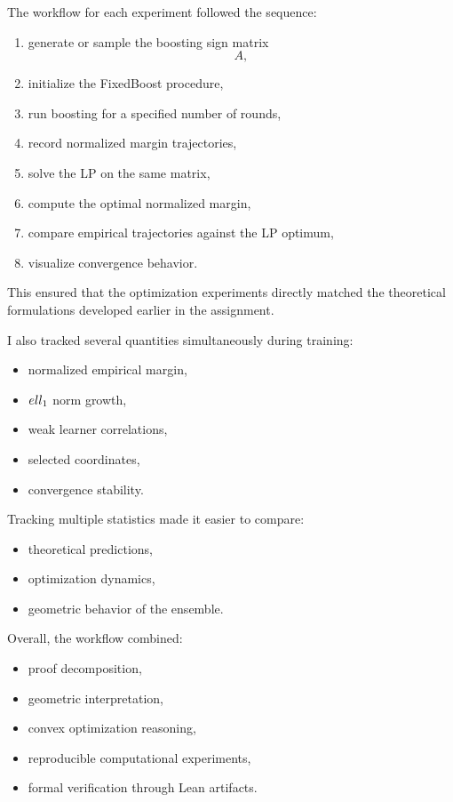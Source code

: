 \documentclass[11pt]{article}
\begin{document}
\begin{enumerate}
\begin{solutionbox}
The workflow for each experiment followed the sequence:
\begin{enumerate}
    \item generate or sample the boosting sign matrix
    \[
    A,
    \]
    \item initialize the FixedBoost procedure,
    \item run boosting for a specified number of rounds,
    \item record normalized margin trajectories,
    \item solve the LP on the same matrix,
    \item compute the optimal normalized margin,
    \item compare empirical trajectories against the LP optimum,
    \item visualize convergence behavior.
\end{enumerate}

This ensured that the optimization experiments directly matched the theoretical formulations developed earlier in the assignment.

\medskip

I also tracked several quantities simultaneously during training:
\begin{itemize}
    \item normalized empirical margin,
    \item $\\ell_1$ norm growth,
    \item weak learner correlations,
    \item selected coordinates,
    \item convergence stability.
\end{itemize}

Tracking multiple statistics made it easier to compare:
\begin{itemize}
    \item theoretical predictions,
    \item optimization dynamics,
    \item geometric behavior of the ensemble.
\end{itemize}

\medskip

Overall, the workflow combined:
\begin{itemize}
    \item proof decomposition,
    \item geometric interpretation,
    \item convex optimization reasoning,
    \item reproducible computational experiments,
    \item formal verification through Lean artifacts.
\end{itemize}


\end{solutionbox}
\end{enumerate}
\end{document}
